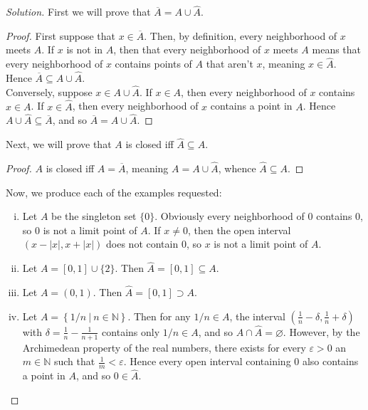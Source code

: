 \documentclass[12pt]{article}
\newenvironment{solution}
  {\renewcommand\qedsymbol{$\blacksquare$}\begin{proof}[Solution]}
{\end{proof}}
\newenvironment{sproof}{
  \renewcommand\qedsymbol{$\square$}
  \begin{proof}
  }{
  \end{proof}
}
\begin{document}
\begin{solution}
  First we will prove that $\overline{A}=A\cup\widehat{A}$.
  \begin{sproof}
    First suppose that $x\in\overline{A}$.
    Then, by definition, every neighborhood of $x$ meets $A$.
    If $x$ is not in $A$, then that every neighborhood of $x$ meets $A$ means that every neighborhood of
    $x$ contains points of $A$ that aren't $x$, meaning $x\in\widehat{A}$.
    Hence $\overline{A}\subseteq A\cup\widehat{A}$.\\\indent
    Conversely, suppose $x\in A\cup\widehat{A}$.
    If $x\in A$, then every neighborhood of $x$ contains $x\in A$.
    If $x\in \widehat{A}$, then every neighborhood of $x$ contains a point in $A$.
    Hence $A\cup\widehat{A}\subseteq \overline{A}$, and so $\overline{A} = A\cup\widehat{A}$.
  \end{sproof}
  \newpage
  Next, we will prove that $A$ is closed iff $\widehat{A}\subseteq A$.
  \begin{sproof}
    $A$ is closed iff $A=\overline{A}$, meaning $A=A\cup\widehat{A}$, whence $\widehat{A}\subseteq{A}$.
  \end{sproof}
  Now, we produce each of the examples requested:
  \begin{enumerate}[(i)]
    \item Let $A$ be the singleton set $\{0\}$.
      Obviously every neighborhood of 0 contains 0, so 0 is not a limit point of $A$.
      If $x\neq0$, then the open interval $(x-|x|, x+|x|)$ does not contain $0$, 
      so $x$ is not a limit point of $A$.

    \item Let $A = [0, 1] \cup \{2\}$.
      Then $\widehat{A} = [0,1]\subseteq A$.

    \item Let $A=(0,1)$. 
      Then $\widehat{A}=[0,1]\supset A$.

    \item Let $A = \left\{ 1/n\  |\  n\in\mathbb{N} \right\}$.
      Then for any $1/n\in A$, the interval $\left(\frac{1}{n}-\delta,\frac{1}{n}+\delta\right)$ 
      with $\delta=\frac{1}{n} - \frac{1}{n+1}$ contains only $1/n\in A$, 
      and so $A\cap\widehat{A}=\varnothing.$
      However, by the Archimedean property of the real numbers, there exists for every 
      $\varepsilon>0$ an $m\in\mathbb{N}$ such that $\frac{1}{m} < \varepsilon$.
      Hence every open interval containing $0$ also contains a point in $A$, and so $0\in\widehat{A}$. 
  \end{enumerate}
\end{solution}
\end{document}
